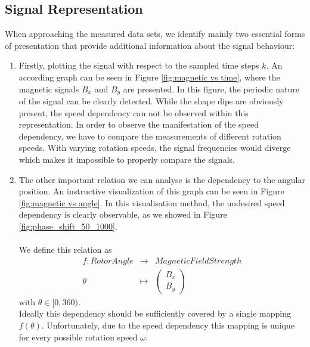 \documentclass[english]{isasthesis}
\begin{document}
    		\subsection{Signal Representation}\label{data representation}
    		When approaching the measured data sets, we identify mainly two essential forms of presentation that provide additional information about the signal behaviour:
    		\begin{enumerate}
    		\item Firstly, plotting the signal with respect to the sampled time steps $k$. An according graph can be seen in Figure \ref{fig:magnetic vs time}, where the magnetic signals $B_x$ and $B_y$ are presented. In this figure, the periodic nature of the signal can be clearly detected. While the shape dips are obviously present, the speed dependency can not be observed within this representation. In order to observe the manifestation of the speed dependency, we have to compare the measurements of different rotation speeds. With varying rotation speeds, the signal frequencies would diverge which makes it impossible to properly compare the signals.
			\item The other important relation we can analyse is the dependency to the angular position. An instructive visualization of this graph can be seen in Figure \ref{fig:magnetic vs angle}. In this visualisation method, the undesired speed dependency is clearly observable, as we showed in Figure \ref{fig:phase_shift_50_1000}. \\ \\
			We define this relation as
			\begin{equation}
			\begin{array}{ccl}
			f:	Rotor Angle & \rightarrow & Magnetic Field Strength \\
				     \theta & \mapsto & \begin{pmatrix}
				     B_x\\B_y
				     \end{pmatrix}	
			\end{array}	          			
			\end{equation}
			with $\theta \in [0,360)$. \\
			Ideally this dependency should be sufficiently covered by a single mapping $f(\theta)$. Unfortunately, due to the speed dependency this mapping is unique for every possible rotation speed $\omega$.
    		\end{enumerate}
\end{document}
